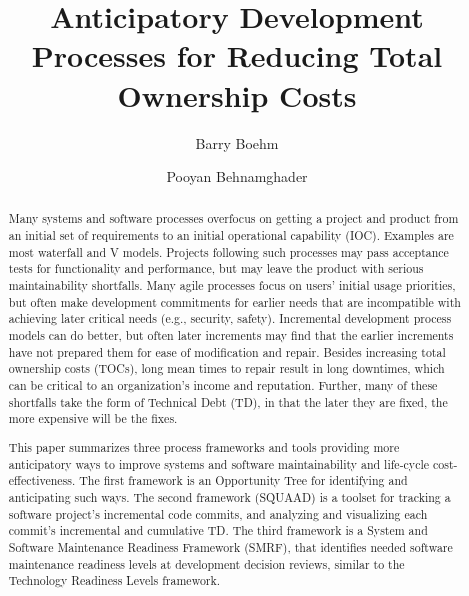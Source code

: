 \documentclass[alpha-refs]{wiley-article}
\title{Anticipatory Development Processes for Reducing Total Ownership Costs}
\author[1]{Barry Boehm}
\author[1]{Pooyan Behnamghader}
\affil[1]{Computer Science Deparment, University of Southern California, Los Angeles, California, 90007, USA}
\begin{document}
\maketitle

\begin{abstract}
Many systems and software processes overfocus on getting a project and product from an initial set of requirements to an initial operational capability (IOC).  Examples are most waterfall and V models.  Projects following such processes may pass acceptance tests for functionality and performance, but may leave the product with serious maintainability shortfalls.  Many agile processes focus on users' initial usage priorities, but often make development commitments for earlier needs that are incompatible with achieving later critical needs (e.g., security, safety).  Incremental development process models can do better, but often later increments may find that the earlier increments have not prepared them for ease of modification and repair.  Besides increasing total ownership costs (TOCs), long mean times to repair result in long downtimes, which can be critical to an organization's income and reputation.  Further, many of these shortfalls take the form of Technical Debt (TD), in that the later they are fixed, the more expensive will be the fixes. 

This paper summarizes three process frameworks and tools providing more anticipatory ways to improve systems and software maintainability and life-cycle cost-effectiveness.  The first framework is an Opportunity Tree for identifying and anticipating such ways. 
The second framework (SQUAAD) is a toolset for tracking a software project's incremental code commits, and analyzing and visualizing each commit's incremental and cumulative TD.
The third framework is a System and Software Maintenance Readiness Framework (SMRF), that identifies needed software maintenance readiness levels at development decision reviews, similar to the Technology Readiness Levels framework.


\end{abstract}
\end{document}
